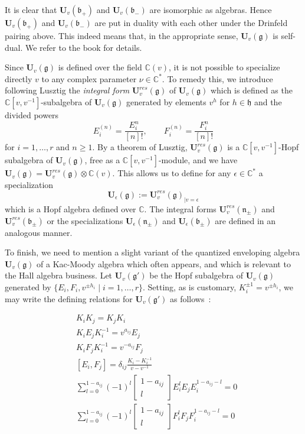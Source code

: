 \documentclass[a4paper,10pt]{amsart}
\def\U{\mathbf{U}}
\def\C{\mathbb{C}}
\def\g{\mathfrak{g}}
\def\bo{\mathfrak{b}}
\def\h{\mathfrak{h}}
\def\n{\mathfrak{n}}
\numberwithin{equation}{section}
\begin{document}
{\vspace{.2in}

It is clear that $\U_v(\bo_+)$ and $\U_v(\bo_-)$ are isomorphic as algebras. Hence $\U_v(\bo_+)$ and $\U_v(\bo_-)$ are put in duality with each other under the Drinfeld pairing above. This indeed means that, in the appropriate sense, $\U_v(\g)$ is self-dual. We refer to the book \cite{Jantzen} for details.

\vspace{.1in}


Since $\U_v(\g)$ is defined over the field $\C(v)$, it is not possible to specialize directly $v$ to any complex parameter $\nu \in \C^*$. To remedy this, we introduce following Lusztig \cite{Lu1} the \textit{integral form} $\U_v^{res}(\g)$ of $\U_v(\g)$ which is defined as the $\C[v,v^{-1}]$-subalgebra
of $\U_v(\g)$ generated by elements $v^h$ for $h \in \h$ and the divided powers
$$E_i^{(n)}=\frac{E_i^n}{[n]!}, \qquad F_i^{(n)}=\frac{F_i^n}{[n]!}$$
for $i=1, \ldots, r$ and $n \geq 1$. By a theorem of Lusztig, $\U^{res}_v(\g)$ is a $\C[v,v^{-1}]$-Hopf subalgebra of $\U_v(\g)$, free as a $\C[v,v^{-1}]$-module, and we have $\U_v(\g)=\U^{res}_v(\g) \otimes \C(v)$. This allows us to define for any $\epsilon \in \C^*$ a specialization
$$\U_\epsilon(\g):=\U^{res}_v(\g)_{|v=\epsilon}$$
which is a Hopf algebra defined over $\C$.
The integral forms $\U_v^{res}(\n_{\pm})$ and $\U_v^{res}(\bo_{\pm})$ or the specializations $\U_\epsilon(\n_{\pm})$ and $\U_\epsilon(\bo_{\pm})$ are defined in an analogous manner.

\vspace{.2in}

To finish, we need to mention a slight variant of the quantized enveloping algebra $\U_v(\g)$ of a Kac-Moody algebra which often appears, and which is relevant to the Hall algebra business. Let $\U_v(\g')$ be the Hopf subalgebra of $\U_v(\g)$ generated by $\{E_i, F_i, v^{\pm h_i}\;|\; i=1, \ldots, r\}$. Setting, as is customary, $K_i^{\pm 1}= v^{\pm h_i}$, we may write the defining relations for $\U_v(\g')$ as follows~:

\vspace{.05in}

\begin{equation}\label{E:defquantumgroups}
\begin{split}
&K_i K_j=K_j K_i  \\
&K_i E_j K_i^{-1}=v^{a_{ij}} E_j  \\
&K_iF_j K_i^{-1}=v^{-a_{ij}} F_j \\
&[E_i,F_j]= \delta_{ij} \frac{K_i-K_i^{-1}}{v -v^{-1}}\\
&\sum_{l=0}^{1-a_{ij}} (-1)^l \begin{bmatrix} 1-a_{ij} \\ l \end{bmatrix} E_i^l E_j E_i^{1-a_{ij}-l}=0  \\
&\sum_{l=0}^{1-a_{ij}} (-1)^l \begin{bmatrix} 1-a_{ij} \\ l \end{bmatrix} F_i^l F_j F_i^{1-a_{ij}-l}=0
\end{split}
\end{equation}

}
\end{document}
